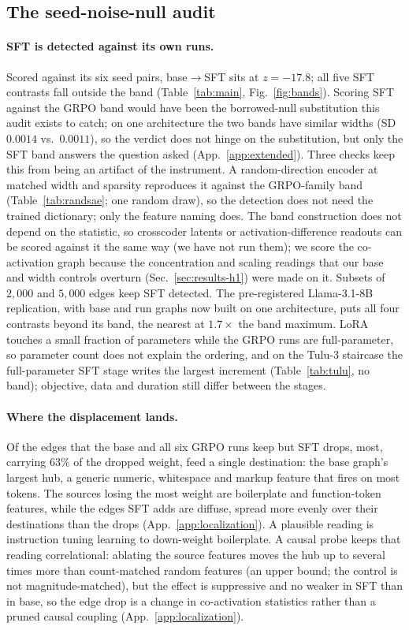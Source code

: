 \documentclass{article}
\begin{document}
\subsection{The seed-noise-null audit}
\label{sec:results-rewiring}
\paragraph{SFT is detected against its own runs.} Scored against its six seed pairs, base$\to$SFT sits at $z=-17.8$; all five SFT contrasts fall outside the band (Table~\ref{tab:main}, Fig.~\ref{fig:bands}). Scoring SFT against the GRPO band would have been the borrowed-null substitution this audit exists to catch; on one architecture the two bands have similar widths (SD $0.0014$ vs.\ $0.0011$), so the verdict does not hinge on the substitution, but only the SFT band answers the question asked (App.~\ref{app:extended}). Three checks keep this from being an artifact of the instrument. A random-direction encoder at matched width and sparsity reproduces it against the GRPO-family band (Table~\ref{tab:randsae}; one random draw), so the detection does not need the trained dictionary; only the feature naming does. The band construction does not depend on the statistic, so crosscoder latents or activation-difference readouts can be scored against it the same way (we have not run them); we score the co-activation graph because the concentration and scaling readings that our base and width controls overturn (Sec.~\ref{sec:results-h1}) were made on it. Subsets of $2{,}000$ and $5{,}000$ edges keep SFT detected. The pre-registered Llama-3.1-8B replication, with base and run graphs now built on one architecture, puts all four contrasts beyond its band, the nearest at $1.7\times$ the band maximum. LoRA touches a small fraction of parameters while the GRPO runs are full-parameter, so parameter count does not explain the ordering, and on the Tulu-3 staircase the full-parameter SFT stage writes the largest increment (Table~\ref{tab:tulu}, no band); objective, data and duration still differ between the stages.

\paragraph{Where the displacement lands.} Of the edges that the base and all six GRPO runs keep but SFT drops, most, carrying $63\%$ of the dropped weight, feed a single destination: the base graph's largest hub, a generic numeric, whitespace and markup feature that fires on most tokens. The sources losing the most weight are boilerplate and function-token features, while the edges SFT adds are diffuse, spread more evenly over their destinations than the drops (App.~\ref{app:localization}). A plausible reading is instruction tuning learning to down-weight boilerplate. A causal probe keeps that reading correlational: ablating the source features moves the hub up to several times more than count-matched random features (an upper bound; the control is not magnitude-matched), but the effect is suppressive and no weaker in SFT than in base, so the edge drop is a change in co-activation statistics rather than a pruned causal coupling (App.~\ref{app:localization}).
\end{document}
